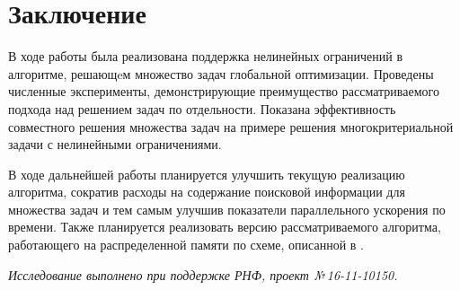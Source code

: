 \documentclass{cmi}
\begin{document}
\section*{Заключение}

В ходе работы была реализована поддержка нелинейных ограничений в алгоритме, решающeм
множество задач глобальной оптимизации. Проведены численные эксперименты, демонстрирующие
преимущество рассматриваемого подхода над решением задач по отдельности. Показана эффективность
совместного решения множества задач на примере решения многокритериальной задачи с
нелинейными ограничениями.

В ходе дальнейшей работы планируется улучшить текущую реализацию алгоритма,
сократив расходы на содержание поисковой информации для множества задач и тем самым улучшив
показатели параллельного ускорения по времени. Также планируется реализовать версию
рассматриваемого алгоритма, работающего на распределенной памяти по схеме, описанной в \cite{BarkalovLebedev2017_2}.

\vspace{1em}
{\it Исследование выполнено при поддержке РНФ, проект №\,16-11-10150.}
\end{document}
